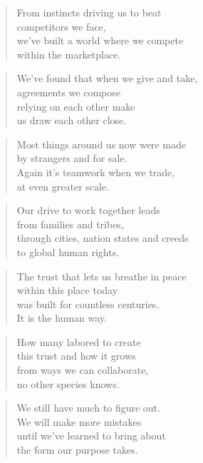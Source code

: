 \documentclass[10pt,a4paper]{article}
\begin{document}
\begin{paracol}{2}
\begin{verse}
From instincts driving us to beat\\
competitors we face,\\
we’ve built a world where we compete\\
within the marketplace.
\end{verse}

\begin{verse}
We’ve found that when we give and take,\\
agreements we compose\\
relying on each other make\\
us draw each other close.
\end{verse}

\begin{verse}
Most things around us now were made\\
by strangers and for sale.\\
Again it’s teamwork when we trade,\\
at even greater scale.
\end{verse}

\begin{verse}
Our drive to work together leads\\
from families and tribes,\\
through cities, nation states and creeds\\
to global human rights.
\end{verse}

\begin{verse}
The trust that lets us breathe in peace\\
within this place today\\
was built for countless centuries.\\
It is the human way.
\end{verse}

\begin{verse}
How many labored to create\\
this trust and how it grows\\
from ways we can collaborate,\\
no other species knows.
\end{verse}

\begin{verse}
We still have much to figure out.\\
We will make more mistakes\\
until we’ve learned to bring about\\
the form our purpose takes.
\end{verse}


\end{paracol}
\end{document}
